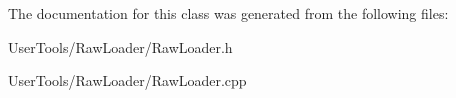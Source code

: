 The documentation for this class was generated from the following files\-:\begin{DoxyCompactItemize}
\item 
User\-Tools/\-Raw\-Loader/Raw\-Loader.\-h\item 
User\-Tools/\-Raw\-Loader/Raw\-Loader.\-cpp\end{DoxyCompactItemize}
